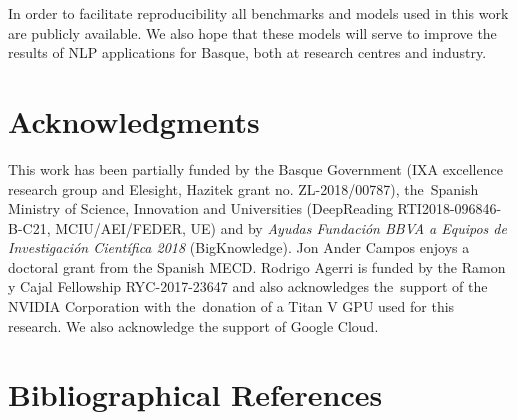 \documentclass[10pt, a4paper]{article}
\begin{document}
In order to facilitate reproducibility all benchmarks and models used in this work are publicly available. We also hope that these models will serve to improve the results of NLP applications for Basque, both at research centres and industry.




\section{Acknowledgments}

This work has been partially funded by the Basque Government (IXA excellence research group and Elesight, Hazitek grant no. ZL-2018/00787), the~Spanish Ministry of Science, Innovation and Universities (DeepReading RTI2018-096846-B-C21, MCIU/AEI/FEDER, UE) and by \textit{Ayudas Fundación BBVA a Equipos de Investigación Científica 2018} (BigKnowledge).  Jon Ander Campos enjoys a doctoral grant from the Spanish MECD.  Rodrigo Agerri is funded by the Ramon y Cajal Fellowship RYC-2017-23647 and also acknowledges the~support of the NVIDIA Corporation with the~donation of a Titan V GPU used for this research. We also acknowledge the support of Google Cloud.

\section{Bibliographical References}



\end{document}
